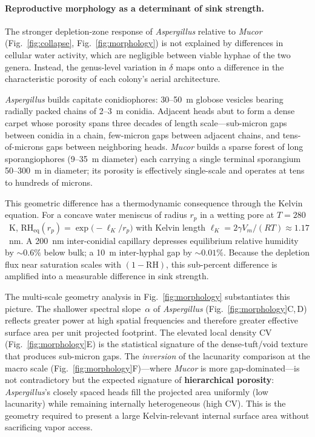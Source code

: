 \paragraph{Reproductive morphology as a determinant of sink strength.}
The stronger depletion-zone response of \textit{Aspergillus}
relative to \textit{Mucor} (Fig.~\ref{fig:collapse},
Fig.~\ref{fig:morphology}) is not explained by differences in
cellular water activity, which are negligible between viable
hyphae of the two genera.  Instead, the genus-level variation in
$\delta$ maps onto a difference in the characteristic porosity of
each colony's aerial architecture.

\textit{Aspergillus} builds capitate conidiophores: 30--50~\textmu m
globose vesicles bearing radially packed chains of 2--3~\textmu m
conidia.  Adjacent heads abut to form a dense carpet whose porosity
spans three decades of length scale---sub-micron gaps between conidia
in a chain, few-micron gaps between adjacent chains, and
tens-of-microns gaps between neighboring heads.
\textit{Mucor} builds a sparse forest of long sporangiophores
(9--35~\textmu m diameter) each carrying a single terminal
sporangium 50--300~\textmu m in diameter; its porosity is
effectively single-scale and operates at tens to hundreds of
microns.

This geometric difference has a thermodynamic consequence through
the Kelvin equation.  For a concave water meniscus of radius $r_p$
in a wetting pore at $T = 280$~K,
$\mathrm{RH}_\mathrm{eq}(r_p) =
  \exp\!\bigl(-\ell_K / r_p\bigr)$
with Kelvin length
$\ell_K = 2\gamma V_m / (RT) \approx 1.17$~nm.
A 200~nm inter-conidial capillary depresses equilibrium relative
humidity by ${\sim}0.6\%$ below bulk; a 10~\textmu m
inter-hyphal gap by ${\sim}0.01\%$.  Because the depletion flux
near saturation scales with $(1 - \mathrm{RH})$, this sub-percent
difference is amplified into a measurable difference in sink
strength.

The multi-scale geometry analysis in Fig.~\ref{fig:morphology}
substantiates this picture.  The shallower spectral
slope~$\alpha$ of \textit{Aspergillus}
(Fig.~\ref{fig:morphology}C,\,D) reflects greater power at high
spatial frequencies and therefore greater effective surface area
per unit projected footprint.  The elevated local density CV
(Fig.~\ref{fig:morphology}E) is the statistical signature of the
dense-tuft/void texture that produces sub-micron gaps.  The
\emph{inversion} of the lacunarity comparison at the macro scale
(Fig.~\ref{fig:morphology}F)---where \textit{Mucor} is more
gap-dominated---is not contradictory but the expected signature of
\textbf{hierarchical porosity}: \textit{Aspergillus}'s closely
spaced heads fill the projected area uniformly (low lacunarity)
while remaining internally heterogeneous (high CV).  This is the
geometry required to present a large Kelvin-relevant internal
surface area without sacrificing vapor access.

